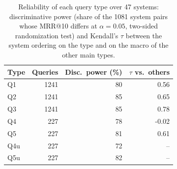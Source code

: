\begin{table}[t]
\centering\small
\caption{Reliability of each query type over 47 systems: discriminative power (share of the
1081 system pairs whose MRR@10 differs at $\alpha=0.05$, two-sided randomization test) and Kendall's
$\tau$ between the system ordering on the type and on the macro of the other main types.}
\label{tab:validity}
\begin{tabular}{lrrr}
\toprule
Type & Queries & Disc.\ power (\%) & $\tau$ vs.\ others \\
\midrule
Q1 & 1241 & 80 & 0.56 \\
Q2 & 1241 & 85 & 0.65 \\
Q3 & 1241 & 85 & 0.78 \\
Q4 & 227 & 78 & -0.02 \\
Q5 & 227 & 81 & 0.61 \\
Q4u & 227 & 72 & -- \\
Q5u & 227 & 82 & -- \\
\bottomrule
\end{tabular}
\end{table}
